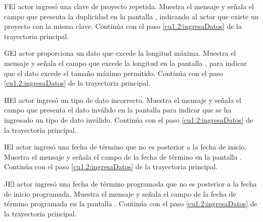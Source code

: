 	 \begin{UCtrayectoriaA}{F}{El actor ingresó una clave de proyecto repetida.}
	    \UCpaso[\UCsist] Muestra el mensaje  y señala el campo que presenta la duplicidad en la pantalla 
		    , indicando al actor que existe un proyecto con la misma clave.
	    \UCpaso[] Continúa con el paso \ref{cu1.2:ingresaDatos} de la trayectoria principal.
	 \end{UCtrayectoriaA}
 
	 \begin{UCtrayectoriaA}{G}{El actor proporciona un dato que excede la longitud máxima.}
	    \UCpaso[\UCsist] Muestra el mensaje  y señala el campo que excede la 
	    longitud en la pantalla , para indicar que el dato excede el tamaño máximo permitido.
	    \UCpaso[] Continúa con el paso \ref{cu1.2:ingresaDatos} de la trayectoria principal.
	 \end{UCtrayectoriaA}
 
	 \begin{UCtrayectoriaA}{H}{El actor ingresó un tipo de dato incorrecto.}
	    \UCpaso[\UCsist] Muestra el mensaje  y señala el campo que presenta el dato inválido en la 
	    pantalla  para indicar que se ha ingresado un tipo de dato inválido.
	    \UCpaso[] Continúa con el paso \ref{cu1.2:ingresaDatos} de la trayectoria principal.
	 \end{UCtrayectoriaA}
	 \begin{UCtrayectoriaA}{I}{El actor ingresó una fecha de término que no es posterior a la fecha de inicio.}
	    \UCpaso[\UCsist] Muestra el mensaje  y señala el campo de la fecha de término en la 
	    pantalla .
	    \UCpaso[] Continúa con el paso \ref{cu1.2:ingresaDatos} de la trayectoria principal.
	 \end{UCtrayectoriaA}
	 \begin{UCtrayectoriaA}{J}{El actor ingresó una fecha de término programada que no es posterior a la fecha de inicio programada.}
	    \UCpaso[\UCsist] Muestra el mensaje  y señala el campo de la fecha de término programada en la 
	    pantalla .
	    \UCpaso[] Continúa con el paso \ref{cu1.2:ingresaDatos} de la trayectoria principal.
	 \end{UCtrayectoriaA}